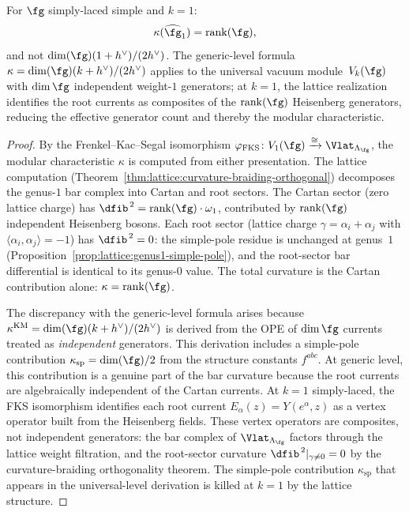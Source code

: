 \begin{proposition}%
\label{prop:level1-kappa-reduction}%
%
For $\fg$ simply-laced simple and $k = 1$:
\begin{equation}\label{eq:level1-kappa-reduction}
\kappa(\widehat{\fg}_1)
= \operatorname{rank}(\fg),
\end{equation}
and not $\dim(\fg)(1+h^\vee)/(2h^\vee)$. The generic-level
formula $\kappa=\dim(\fg)(k+h^\vee)/(2h^\vee)$ applies to the
universal vacuum module~$V_k(\fg)$ with $\dim\fg$
independent weight-$1$ generators; at $k = 1$, the lattice
realization identifies the root currents as composites of the
$\operatorname{rank}(\fg)$ Heisenberg generators, reducing
the effective generator count and thereby the modular
characteristic.
\end{proposition}

\begin{proof}
By the Frenkel--Kac--Segal isomorphism
$\varphi_{\mathrm{FKS}} \colon V_1(\fg)
\xrightarrow{\cong} \Vlat_{\Lambda_\fg}$,
the modular characteristic $\kappa$ is computed from either
presentation. The lattice computation
(Theorem~\ref{thm:lattice:curvature-braiding-orthogonal})
decomposes the genus-$1$ bar complex into Cartan and root
sectors. The Cartan sector (zero lattice charge) has
$\dfib^{\,2} = \operatorname{rank}(\fg) \cdot \omega_1$,
contributed by $\operatorname{rank}(\fg)$ independent
Heisenberg bosons. Each root sector (lattice charge
$\gamma = \alpha_i + \alpha_j$ with
$\langle \alpha_i, \alpha_j \rangle = -1$) has
$\dfib^{\,2} = 0$: the simple-pole residue is unchanged at
genus~$1$
(Proposition~\ref{prop:lattice:genus1-simple-pole}), and
the root-sector bar differential is identical to its
genus-$0$ value. The total curvature is the Cartan
contribution alone: $\kappa = \operatorname{rank}(\fg)$.

The discrepancy with the
generic-level formula arises because
$\kappa^{\mathrm{KM}} = \dim(\fg)(k+h^\vee)/(2h^\vee)$
is derived from the OPE of $\dim\fg$ currents treated as
\emph{independent} generators. This derivation
includes a simple-pole contribution
$\kappa_{\mathrm{sp}} = \dim(\fg)/2$ from the structure
constants $f^{abc}$. At generic level, this contribution is
a genuine part of the bar curvature because the root currents
are algebraically independent of the Cartan currents. At
$k = 1$ simply-laced, the FKS isomorphism identifies each root
current $E_\alpha(z) = Y(e^\alpha, z)$ as a vertex operator
built from the Heisenberg fields. These vertex operators are
composites, not independent generators: the bar complex of
$\Vlat_{\Lambda_\fg}$ factors through the lattice
weight filtration, and the root-sector curvature
$\dfib^{\,2}|_{\gamma \neq 0} = 0$ by the curvature-braiding
orthogonality theorem. The simple-pole contribution
$\kappa_{\mathrm{sp}}$ that appears in the universal-level
derivation is killed at $k = 1$ by the lattice structure.
\end{proof}


